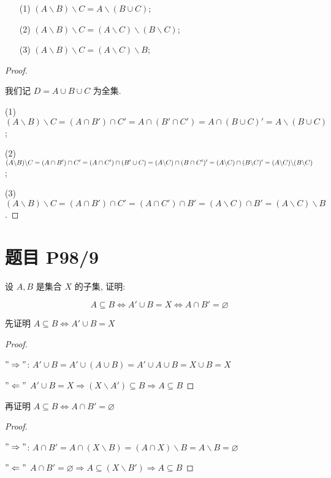 \begin{itemize}[leftmargin=1.5cm]
	\item[(1)] $(A \backslash B)\backslash C = A\backslash(B \cup C)$;
	\item[(2)] $(A \backslash B)\backslash C = (A\backslash C)\backslash(B \backslash C)$;
	\item[(3)] $(A \backslash B)\backslash C = (A \backslash C)\backslash B$;
	
\end{itemize}

\begin{proof}
	 \
	 
	我们记 $D=A\cup B\cup C$ 为全集. 
	
	(1) $(A\backslash B) \backslash C = (A\cap B')\cap C' = A \cap (B' \cap C') = A\cap(B \cup C)' = A\backslash (B \cup C)$;
	
	(2) $(A\backslash B) \backslash C = (A\cap B')\cap C' = (A \cap C') \cap (B' \cup C) = (A \backslash C)\cap(B \cap C')' \\= (A \backslash C)\cap (B \backslash C)' = (A \backslash C)\backslash (B \backslash C)$;
	
	(3) $(A\backslash B) \backslash C = (A\cap B')\cap C' = (A \cap C') \cap B' = (A \backslash C)\cap B'= (A \backslash C)\backslash B$.
\end{proof}

\section*{题目 P98/9}

设 $A,B$ 是集合 $X$ 的子集, 证明:

$$A \subseteq B \Leftrightarrow A' \cup B = X \Leftrightarrow A\cap B' = \varnothing$$


先证明 $A \subseteq B \Leftrightarrow A' \cup B = X$
\begin{proof}\
	
	$"\Rightarrow"$: 
	$
	A'\cup B = A' \cup (A \cup B) = A'\cup A \cup B = X \cup B = X
	$
	
	$"\Leftarrow"$
	$
	 A' \cup B = X \Rightarrow (X \backslash A') \subseteq B \Rightarrow A \subseteq B
	$
\end{proof}

再证明 $A \subseteq B \Leftrightarrow A\cap B' = \varnothing$

\begin{proof}\
	
	$"\Rightarrow"$: 
	$
	A\cap B' = A \cap (X \backslash B) = (A \cap X) \backslash B = A \backslash B = \varnothing
	$
	
	$"\Leftarrow"$
	$
	A \cap B' = \varnothing \Rightarrow A \subseteq (X \backslash B') \Rightarrow A \subseteq B
	$
\end{proof}

